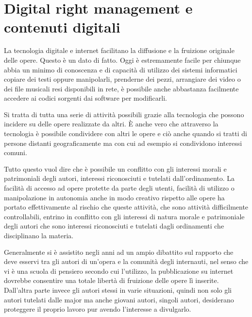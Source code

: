 \section{Digital right management e contenuti digitali}

La tecnologia digitale e internet facilitano la diffusione e la fruizione originale delle opere. Questo è un dato di fatto. Oggi è estremamente facile per chiunque abbia un minimo di conoscenza e di capacità di utilizzo dei sistemi informatici copiare dei testi oppure manipolarli, prenderne dei pezzi, arrangiare dei video o dei file musicali resi disponibili in rete, è possibile anche abbastanza facilmente accedere ai codici sorgenti dai software per modificarli. 

Si tratta di tutta una serie di attività possibili grazie alla tecnologia che possono incidere su delle opere realizzate da altri. È anche vero che attraverso la tecnologia è possibile condividere con altri le opere e ciò anche quando si tratti di persone distanti geograficamente ma con cui ad esempio si condividono interessi comuni. 

Tutto questo vuol dire che è possibile un conflitto con gli interessi morali e patrimoniali degli autori, interessi riconosciuti e tutelati dall'ordinamento. La facilità di accesso ad opere protette da parte degli utenti, facilità di utilizzo o manipolazione in autonomia anche in modo creativo rispetto alle opere ha portato effettivamente al rischio che queste attività, che sono attività difficilmente controllabili, entrino in conflitto con gli interessi di natura morale e patrimoniale degli autori che sono interessi riconosciuti e tutelati dagli ordinamenti che disciplinano la materia.

Generalmente si è assistito negli anni ad un ampio dibattito sul rapporto che deve esservi tra gli autori di un'opera e la comunità degli internauti, nel senso che vi è una scuola di pensiero secondo cui l'utilizzo, la pubblicazione su internet dovrebbe consentire una totale libertà di fruizione delle opere lì inserite. Dall'altra parte invece gli autori stessi in varie situazioni, quindi non solo gli autori tutelati dalle major ma anche giovani autori, singoli autori, desiderano proteggere il proprio lavoro pur avendo l'interesse a divulgarlo. 

